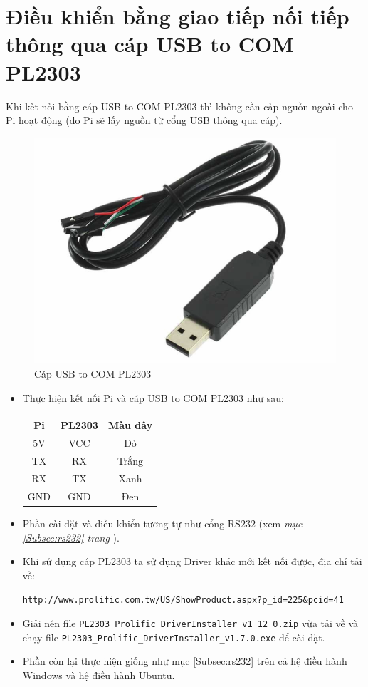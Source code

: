 \section{Điều khiển bằng giao tiếp nối tiếp thông qua cáp USB to COM PL2303}
Khi kết nối bằng cáp USB to COM PL2303 thì không cần cấp nguồn ngoài cho Pi hoạt động (do Pi sẽ lấy nguồn từ cổng USB thông qua cáp).
\begin{figure}[!h]
\begin{center}
\includegraphics[scale=.3]{remote/images/cap-usb-to-com-pl2303}
\end{center}
\caption{Cáp USB to COM PL2303}
\end{figure}
\begin{itemize}
\item Thực hiện kết nối Pi và cáp USB to COM PL2303 như sau:
\begin{center}
\begin{tabular}{c|c|c}
Pi & PL2303 & Màu dây\\ \hline
5V & VCC & Đỏ\\
TX & RX & Trắng\\ 
RX & TX & Xanh\\
GND & GND & Đen
\end{tabular}
\end{center}
\item Phần cài đặt và điều khiển tương tự như cổng RS232 (xem \textit{mục \ref{Subsec:rs232} trang \pageref{Subsec:rs232}}).
\item Khi sử dụng cáp PL2303 ta sử dụng Driver khác mới kết nối được, địa chỉ tải về:

\begin{footnotesize}
\verb|http://www.prolific.com.tw/US/ShowProduct.aspx?p_id=225&pcid=41|
\end{footnotesize}
\item Giải nén file \verb|PL2303_Prolific_DriverInstaller_v1_12_0.zip| vừa tải về và chạy file \verb|PL2303_Prolific_DriverInstaller_v1.7.0.exe| để cài đặt.
\item Phần còn lại thực hiện giống như mục \ref{Subsec:rs232} trên cả hệ điều hành Windows và hệ điều hành Ubuntu.
\end{itemize}
